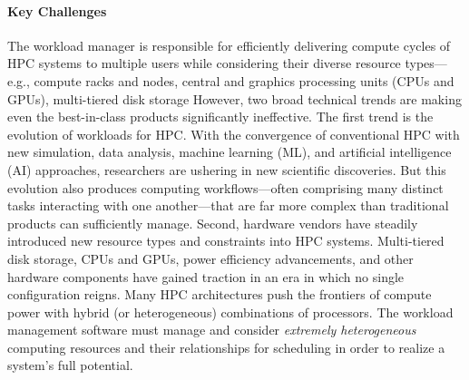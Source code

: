 \paragraph{Key  Challenges}
The workload manager is responsible for efficiently
delivering compute cycles of HPC systems to multiple users while considering their
diverse resource types---e.g., compute racks and nodes, central and graphics
processing units (CPUs and GPUs), multi-tiered disk storage
%
However, two broad technical trends are making even the best-in-class
products significantly ineffective.
%
The first trend is the evolution of workloads for HPC. With the convergence
of conventional HPC with new simulation, data analysis, machine learning (ML),
and artificial intelligence (AI) approaches, researchers are ushering in
new scientific discoveries. But this evolution also produces computing
workflows---often comprising many distinct tasks interacting with one
another---that are far more complex than traditional products
can sufficiently manage.
%
Second, hardware vendors have steadily introduced
new resource types and constraints into HPC systems.
Multi-tiered disk storage, CPUs and GPUs,
power efficiency advancements, and other hardware components have gained
traction in an era in which no single configuration reigns. Many HPC
architectures push the frontiers of compute power with hybrid (or
heterogeneous) combinations of processors.
The workload management software must manage and consider {\em extremely heterogeneous} computing
resources and their relationships for scheduling in order to realize a
system's full potential.
%

